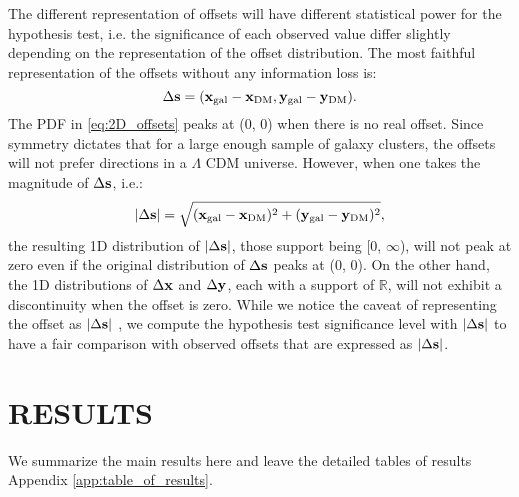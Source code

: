 The different representation of offsets will have different statistical power
for the hypothesis test, i.e. the significance of each observed value differ
slightly depending on the representation of the offset distribution. 
The most faithful representation of the offsets without any information loss
is:
\begin{equation}
	\Delta {\bf s} = ({\bf x}_{\rm gal} - {\bf x}_{\rm DM}, 
	{\bf y}_{\rm gal} - {\bf y}_{\rm DM} ).
	\label{eq:2D_offsets}
\end{equation}
The PDF in \ref{eq:2D_offsets} peaks at (0, 0) when there is no real offset.
Since symmetry dictates that for a large enough sample of galaxy clusters,
the offsets will not prefer directions in a $\Lambda$ CDM universe.  
However, when one takes the magnitude of $\Delta {\bf s}$, i.e.:
\begin{equation}
	|\Delta {\bf s}| = \sqrt{({\bf x}_{\rm gal} - {\bf x}_{\rm DM})^2 + 
	({\bf y}_{\rm gal} - {\bf y}_{\rm DM})^2},
	\label{eq:magnitude_offsets}
\end{equation}
the resulting 1D distribution of $|\Delta {\bf s}|$, 
those support being [0, $\infty$),
will not peak at zero even if the original
distribution of $\Delta {\bf s}$ peaks at (0, 0). On the other hand, 
the 1D distributions of $\Delta {\bf x}$ and $\Delta {\bf y}$,
each with a support of $\mathbb{R}$, will not exhibit a discontinuity when
the offset is zero. 
While we notice the caveat of representing the offset as $|\Delta {\bf s}|$ 
, we compute the hypothesis test significance level with $|\Delta {\bf s}|$ to 
have a fair comparison with observed offsets that are expressed as $|\Delta
{\bf s}|$.

\section{RESULTS} 
\label{sec:results}
We summarize the main results here and leave the detailed tables of results 
Appendix \ref{app:table_of_results}.






